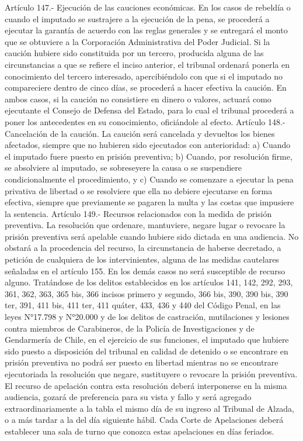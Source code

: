     Artículo 147.- Ejecución de las cauciones económicas. En los casos de rebeldía o cuando el imputado se sustrajere a la ejecución de la pena, se procederá a ejecutar la garantía de acuerdo con las reglas generales y se entregará el monto que se obtuviere a la Corporación Administrativa del Poder Judicial.
    Si la caución hubiere sido constituida por un tercero, producida alguna de las circunstancias a que se refiere el inciso anterior, el tribunal ordenará ponerla en conocimiento del tercero interesado, apercibiéndolo con que si el imputado no compareciere dentro de cinco días, se procederá a hacer efectiva la caución.
    En ambos casos, si la caución no consistiere en dinero o valores, actuará como ejecutante el Consejo de Defensa del Estado, para lo cual el tribunal procederá a poner los antecedentes en su conocimiento, oficiándole al efecto.
    Artículo 148.- Cancelación de la caución. La caución será cancelada y devueltos los bienes afectados, siempre que no hubieren sido ejecutados con anterioridad:
    a) Cuando el imputado fuere puesto en prisión preventiva;
    b) Cuando, por resolución firme, se absolviere al imputado, se sobreseyere la causa o se suspendiere condicionalmente el procedimiento, y
    c) Cuando se comenzare a ejecutar la pena privativa de libertad o se resolviere que ella no debiere ejecutarse en forma efectiva, siempre que previamente se pagaren la multa y las costas que impusiere la sentencia.
    Artículo 149.- Recursos relacionados con la medida de prisión preventiva. La resolución que ordenare, mantuviere, negare lugar o revocare la prisión preventiva será apelable cuando hubiere sido dictada en una audiencia. No obstará a la procedencia del recurso, la circunstancia de haberse decretado, a petición de cualquiera de los intervinientes, alguna de las medidas cautelares señaladas en el artículo 155. En los demás casos no será susceptible de recurso alguno.
    Tratándose de los delitos establecidos en los artículos 141, 142, 292, 293, 361, 362, 363, 365 bis, 366 incisos primero y segundo, 366 bis, 390, 390 bis, 390 ter, 391, 411 bis, 411 ter, 411 quáter, 433, 436 y 440 del Código Penal, en las leyes N°17.798 y N°20.000 y de los delitos de castración, mutilaciones y lesiones contra miembros de Carabineros, de la Policía de Investigaciones y de Gendarmería de Chile, en el ejercicio de sus funciones, el imputado que hubiere sido puesto a disposición del tribunal en calidad de detenido o se encontrare en prisión preventiva no podrá ser puesto en libertad mientras no se encontrare ejecutoriada la resolución que negare, sustituyere o revocare la prisión preventiva. El recurso de apelación contra esta resolución deberá interponerse en la misma audiencia, gozará de preferencia para su vista y fallo y será agregado extraordinariamente a la tabla el mismo día de su ingreso al Tribunal de Alzada, o a más tardar a la del día siguiente hábil. Cada Corte de Apelaciones deberá establecer una sala de turno que conozca estas apelaciones en días feriados.
